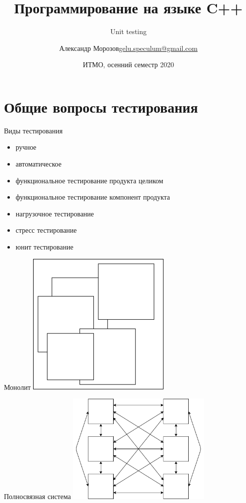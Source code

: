 \documentclass[unknownkeysallowed,xcolor=table]{beamer}
\title[C++]
{Программирование на языке C++}
\subtitle{Unit testing}
\author[А.~Б.~Морозов]
{
  \texorpdfstring{Александр Морозов\newline\href{mailto:gelu.speculum@gmail.com}{gelu.speculum@gmail.com}}
  {Александр Морозов}
}
\date[ITMO 2020]
{ИТМО, осенний семестр 2020}
\begin{document}
\section{Общие вопросы тестирования}

\begin{frame}{Виды тестирования}
  \begin{itemize}
    \item ручное \vspace{0.5em}
    \item автоматическое
  \end{itemize}
  \vspace{2em}
  \begin{itemize}
    \item функциональное тестирование продукта целиком \vspace{0.5em}
    \item функциональное тестирование компонент продукта \vspace{0.5em}
    \item нагрузочное тестирование \vspace{0.5em}
    \item стресс тестирование \vspace{0.5em}
    \item юнит тестирование
  \end{itemize}
\end{frame}

\begin{frame}{Монолит}
  \includegraphics[align=c,width=7cm,keepaspectratio]{images/unit_testing/monolith.png}
\end{frame}

\begin{frame}{Полносвязная система}
  \includegraphics[align=c,width=7cm,keepaspectratio]{images/unit_testing/interconnected.png}
\end{frame}
\end{document}
